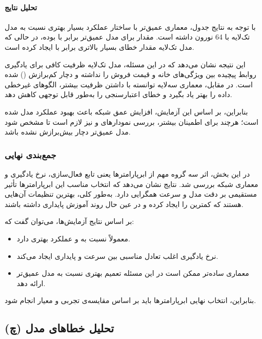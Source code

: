 \documentclass[12pt,a4paper]{article}
\begin{document}
\paragraph{تحلیل نتایج}
با توجه به نتایج جدول، معماری عمیق‌تر با ساختار  عملکرد بسیار بهتری نسبت به مدل تک‌لایه با 64 نورون داشته است. مقدار  برای مدل عمیق‌تر برابر با  بوده، در حالی که مدل تک‌لایه مقدار خطای بسیار بالاتری برابر با  ایجاد کرده است.

این نتیجه نشان می‌دهد که در این مسئله، مدل تک‌لایه ظرفیت کافی برای یادگیری روابط پیچیده بین ویژگی‌های خانه و قیمت فروش را نداشته و دچار کم‌برازش () شده است. در مقابل، معماری سه‌لایه توانسته با داشتن ظرفیت بیشتر، الگوهای غیرخطی داده را بهتر یاد بگیرد و خطای اعتبارسنجی را به‌طور قابل توجهی کاهش دهد.

بنابراین، بر اساس این آزمایش، افزایش عمق شبکه باعث بهبود عملکرد مدل شده است؛ هرچند برای اطمینان بیشتر، بررسی نمودارهای  و  نیز لازم است تا مشخص شود مدل عمیق‌تر دچار بیش‌برازش نشده باشد.

\subsubsection{جمع‌بندی نهایی}
در این بخش، اثر سه گروه مهم از ابرپارامترها یعنی تابع فعال‌سازی، نرخ یادگیری و معماری شبکه بررسی شد.  
نتایج نشان می‌دهد که انتخاب مناسب این ابرپارامترها تأثیر مستقیمی بر دقت مدل و سرعت همگرایی دارد.  
به‌طور کلی، بهترین تنظیمات آن‌هایی هستند که کمترین  را ایجاد کرده و در عین حال روند آموزش پایداری داشته باشند.

\begin{tcolorbox}[colback=blue!5!white, colframe=blue!60!black, title=نتیجه‌گیری بخش (ج)]
	بر اساس نتایج آزمایش‌ها، می‌توان گفت که:
	\begin{itemize}
		\item {} معمولاً نسبت به  و  عملکرد بهتری دارد.
		\item نرخ یادگیری  اغلب تعادل مناسبی بین سرعت و پایداری ایجاد می‌کند.
		\item معماری ساده‌تر ممکن است در این مسئله تعمیم بهتری نسبت به مدل عمیق‌تر ارائه دهد.
	\end{itemize}
	بنابراین، انتخاب نهایی ابرپارامترها باید بر اساس مقایسه‌ی تجربی و معیار  انجام شود.
\end{tcolorbox}
\subsection{(چ) تحلیل خطاهای مدل}
\end{document}
